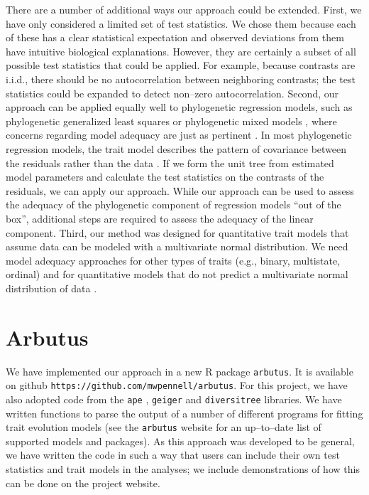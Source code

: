 \documentclass[a4paper,11pt]{article}
\begin{document}
There are a number of additional ways our approach could be extended. First, we have only considered a limited set of test statistics. We chose them because each of these has a clear statistical expectation and observed deviations from them have intuitive biological explanations. However, they are certainly a subset of all possible test statistics that could be applied. 
For example, because contrasts are i.i.d., there should be no autocorrelation between neighboring contrasts; the test statistics could be expanded to detect non--zero autocorrelation. Second, our approach can be applied equally well to phylogenetic regression models, such as phylogenetic generalized least squares \citep{Grafen1989} or phylogenetic mixed models \citep{Lynch1991, Hadfield2010}, where concerns regarding model adequacy are just as pertinent \citep{Hansen2012}. In most phylogenetic regression models, the trait model describes the pattern of covariance between the residuals rather than the data \citep{Rohlf2001, Rohlf2006, Freckleton2011} \citep[but see][]{Hansen2008}. If we form the unit tree from estimated model parameters and calculate the test statistics on the contrasts of the residuals, we can apply our approach. While our approach can be used to assess the adequacy of the phylogenetic component of regression models ``out of the box'', additional steps are required to assess the adequacy of the linear component. Third, our method was designed for quantitative trait models that assume data can be modeled with a multivariate normal distribution. We need model adequacy approaches for other types of traits (e.g., binary, multistate, ordinal) and for quantitative models that do not predict a multivariate normal distribution of data \citep{Landis2012}.

\section{Arbutus}

We have implemented our approach in a new R package \texttt{arbutus}. It is available on github \texttt{https://github.com/mwpennell/arbutus}. For this project, we have also adopted code from the \texttt{ape} \citep{ape}, \texttt{geiger} \citep{geiger2} and \texttt{diversitree} \citep{FitzJohn2012} libraries. We have written functions to parse the output of a number of different programs for fitting trait evolution models (see the \texttt{arbutus} website for an up--to--date list of supported models and packages). As this approach was developed to be general, we have written the code in such a way that users can include their own test statistics and trait models in the analyses; we include demonstrations of how this can be done on the project website.
\end{document}
